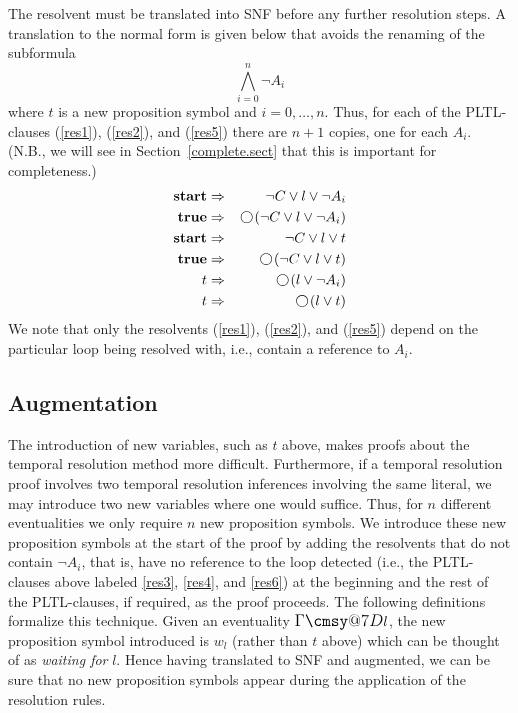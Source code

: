\documentclass[nohyperref]{acmtrans2f}
\makeatletter
\def\sometime{\mathord{\hbox{\large$\mathchar"0\cmsy@7D$}}}
\newcommand{\next}{\!\raisebox{-.2ex}{ %
                        \mbox{\unitlength=0.9ex
                        \begin{picture}(2,2)
                        \linethickness{0.06ex}
                        \put(1,1){\circle{2}} %
                        \end{picture}}}       %
                        \,}
\let\imp=\Rightarrow
\def\ltrue{\hbox{\rm\bf true}}
\def\lstart{\hbox{\rm\bf start}}
\makeatother
\begin{document}
%
The resolvent must be translated into SNF before any further resolution
steps. A translation to the normal form is given below that avoids the 
renaming of the subformula 
$$
\bigwedge_{i=0}^n \neg A_i
$$
where $t$ is a new proposition symbol and $i = 0, \ldots, n$. Thus, for
each of the PLTL-clauses (\ref{res1}), (\ref{res2}), and (\ref{res5}) there
are $n+1$ copies, one for each $A_i$. (N.B., we 
will see in Section~\ref{complete.sect} that this is important for completeness.)
\begin{eqnarray} %
\lstart & \imp & \neg C \lor l \lor \neg A_i \label{res1} \\ 
\ltrue & \imp & \next( \neg C \lor l \lor \neg A_i) \label{res2} \\ 
\lstart & \imp & \neg C \lor l \lor t \label{res3} \\ 
\ltrue & \imp & \next( \neg C \lor l \lor t) \label{res4} \\
t & \imp & \next(l \lor \neg A_i) \label{res5} \\ 
t & \imp & \next(l \lor t)  \label{res6} 
\end{eqnarray}
%
We note that only the resolvents (\ref{res1}), (\ref{res2}), and
(\ref{res5}) depend on the particular loop being resolved with, i.e.,
contain a reference to $A_i$.



\subsection{Augmentation}
\label{augment}
The introduction of new variables,
such as $t$ above, makes proofs about the temporal resolution method more
difficult. Furthermore, if a temporal resolution
proof involves two temporal resolution inferences involving the same literal,
we may introduce two new variables where one would suffice. 
Thus, for $n$ different eventualities we only require $n$ new proposition symbols.
We introduce these new proposition symbols at the start of the proof by adding 
the resolvents that do not contain $\neg A_i$, that is, have no reference
to the loop detected  (i.e., the PLTL-clauses above labeled \ref{res3},
\ref{res4}, and \ref{res6}) at the beginning and the rest of the
PLTL-clauses, if required, as the proof proceeds. The following definitions
formalize 
this technique. Given an eventuality $\sometime l$, the new proposition symbol
introduced is $w_l$ (rather than $t$ above) which can be thought of as {\em
waiting for} $l$. Hence having translated to SNF and augmented, we can be
sure that no new proposition symbols appear during the application of the
resolution rules. 
\end{document}
